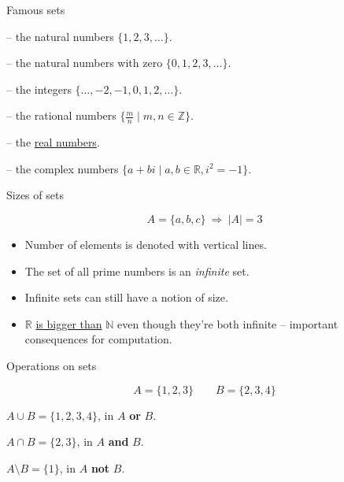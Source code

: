 \begin{frame}[fragile]{Famous sets}
  \begin{description}[123]
    \setlength\itemsep{5mm}
    \item[$\mathbb{N}$] -- the natural numbers $\{ 1, 2, 3, \ldots \}$.
    \item[$\mathbb{N}_0$] -- the natural numbers with zero $\{ 0, 1, 2, 3, \ldots \}$.
    \item[$\mathbb{Z}$] -- the integers $\{ \ldots, -2, -1, 0, 1, 2, \ldots \}$.
    \item[$\mathbb{Q}$] -- the rational numbers $\{ \frac{m}{n} \mid m, n \in \mathbb{Z} \}$.
    \item[$\mathbb{R}$] -- the \href{https://en.wikipedia.org/wiki/Real\_number\#Definition}{real numbers}.
    \item[$\mathbb{C}$] -- the complex numbers $\{ a + bi \mid a, b \in \mathbb{R}, i^2 = -1 \}$.
  \end{description}
\end{frame}


\begin{frame}[fragile]{Sizes of sets}
  \begin{topdisp}
  $$ A = \{a,b,c\} \  \Rightarrow \  \vert A \vert = 3 $$
  \end{topdisp}
  \begin{itemize}
    \setlength\itemsep{4mm}
    \item Number of elements is denoted with vertical lines.
    \item The set of all prime numbers is an \emph{infinite} set.
    \item Infinite sets can still have a notion of size.
    \item $\mathbb{R}$ \href{https://en.wikipedia.org/wiki/Cantor\%27s\_diagonal\_argument}{is bigger than} $\mathbb{N}$ even though they're both infinite -- important consequences for computation.
  \end{itemize}
\end{frame}


\begin{frame}{Operations on sets}
  \begin{topdisp}
    $$ A = \{1,2,3\} \qquad  B = \{2,3,4\}$$
  \end{topdisp}
  \vspace{4mm}
  \begin{description}[Intersection:]
    \setlength\itemsep{6mm}
    \item[Union:] $A \cup B = \{1,2,3,4\}$, in $A$ \textbf{or} $B$.
    \item[Intersection:] $A \cap B = \{2,3\}$, in $A$ \textbf{and} $B$.
    \item[Difference:] $A \setminus B = \{1\}$, in $A$ \textbf{not} $B$.
  \end{description}
\end{frame}






